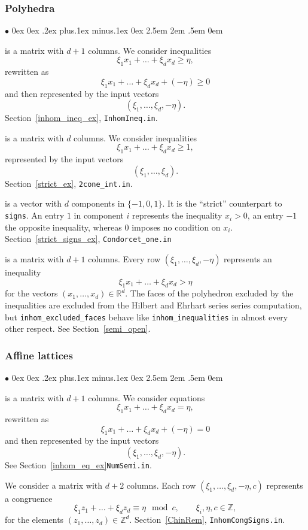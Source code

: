 \documentclass[12pt,a4paper]{scrartcl}
\newcommand{\stdli}{ \topsep0ex \partopsep0ex %
\parsep.2ex plus.1ex minus.1ex \itemsep0ex%
\leftmargin2.5em \labelwidth2em \labelsep.5em \rightmargin0em}%
\renewenvironment{itemize}{\begin{list}{{$\bullet$}}{\stdli}}{\end{list}}
\theoremstyle{definition}
\def\ZZ{{\mathbb Z}}
\def\RR{{\mathbb R}}
\def\itemtt[#1]{\item[\textbf{\ttt{#1}}]}
\def\ttt{\texttt}
\begin{document}
\subsubsection{Polyhedra}

\begin{itemize}
	\itemtt[inhom\_inequalities] is a matrix with $d+1$ columns. We consider inequalities
	$$
	\xi_1x_1+\dots+\xi_dx_d\ge \eta,
	$$
	rewritten as
	$$
	\xi_1x_1+\dots+\xi_dx_d+(-\eta) \ge 0
	$$
	and then represented by the input vectors
	$$
	(\xi_1,\dots,\xi_d,-\eta).
	$$
	Section~\ref{inhom_ineq_ex}, \verb|InhomIneq.in|.
	
	\itemtt[strict\_inequalities] is a matrix with $d$ columns. We consider inequalities
	$$
	\xi_1x_1+\dots+\xi_dx_d\ge 1,
	$$
	represented by the input vectors
	$$
	(\xi_1,\dots,\xi_d).
	$$
	Section~\ref{strict_ex}, \verb|2cone_int.in|.
	
	\itemtt[strict\_signs] is a vector with $d$ components in $\{-1,0,1\}$. It is the ``strict'' counterpart to \verb|signs|. An entry $1$ in component $i$ represents the inequality $x_i>0$, an entry $-1$ the opposite inequality, whereas $0$ imposes no condition on $x_i$. Section~\ref{strict_signs_ex}, \verb|Condorcet_one.in|
	
	\itemtt[inhom\_excluded\_faces] is a matrix with $d+1$ columns. Every row $(\xi_1,\dots,\xi_d,-\eta)$ represents an inequality
	$$
	\xi_1x_1+\dots+\xi_dx_d> \eta
	$$
	for the vectors $(x_1,\dots,x_d)\in\RR^d$. The faces of the polyhedron excluded by the inequalities are excluded from the Hilbert and Ehrhart series series computation, but \verb|inhom_excluded_faces| behave like \verb|inhom_inequalities| in almost every other respect. See Section~\ref{semi_open}.
\end{itemize}

\subsubsection{Affine lattices}

\begin{itemize}
	\itemtt[inhom\_equations] is a matrix with $d+1$ columns. We consider equations
	$$
	\xi_1x_1+\dots+\xi_dx_d= \eta,
	$$
	rewritten as
	$$
	\xi_1x_1+\dots+\xi_dx_d+(-\eta) = 0
	$$
	and then represented by the input vectors
	$$
	(\xi_1,\dots,\xi_d,-\eta).
	$$
	See Section~\ref{inhom_eq_ex}\verb|NumSemi.in|.
	
	\itemtt[inhom\_congruences] We consider a matrix with $d+2$ columns. Each row $(\xi_1,\dots,\xi_d,-\eta,c)$ represents a congruence
	$$
	\xi_1z_1+\dots+\xi_dz_d\equiv \eta \mod c, \qquad \xi_i,\eta,c\in\ZZ,
	$$
	for the elements $(z_1,\dots,z_d)\in\ZZ^d$. Section~\ref{ChinRem}, \verb|InhomCongSigns.in|.
\end{itemize}
\end{document}
